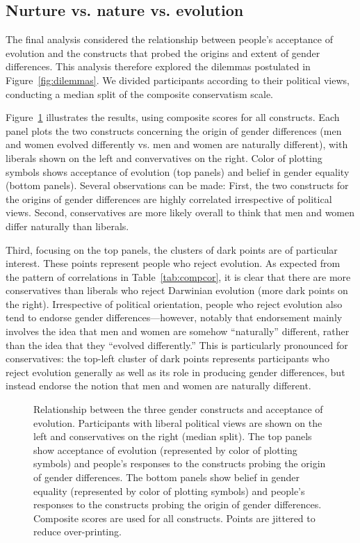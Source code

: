 \documentclass[fignum,man]{apa}\usepackage[]{graphicx}\usepackage[]{color}
\begin{document}
\subsection{Nurture vs. nature vs. evolution}
The final analysis considered the relationship between people's
acceptance of evolution and the 
constructs that probed the origins and extent of gender differences. 
This analysis therefore explored the dilemmas postulated in 
Figure~\ref{fig:dilemmas}.
We divided participants according to their political views,
conducting a median split of the composite conservatism scale.

Figure~\ref{fig:conslibevogrid} illustrates the results,
using composite scores for all constructs. 
Each panel 
plots
the two constructs concerning the origin of gender differences (men and women evolved
differently vs. men and women are naturally different), with liberals shown
on the left and convervatives on the right.
Color of plotting symbols shows acceptance of evolution (top panels) and
belief in gender equality (bottom panels).
Several observations can be made:
First, the two constructs for the origins of gender differences are highly
correlated irrespective of political views.
Second, conservatives are more likely overall to think that
men and women differ naturally than liberals. 

Third, focusing on the top panels, 
the clusters of dark points are of particular interest. These points
represent people
who reject evolution. As expected from the pattern of correlations in 
Table~\ref{tab:compcor}, it is 
clear that there are more conservatives
than liberals who reject Darwinian evolution (more dark points on the right). 
Irrespective
of political orientation, people
who reject evolution also tend to endorse gender differences---however,
notably that endorsement mainly involves the idea that men and women are
somehow ``naturally'' different, rather than the idea that they
``evolved differently.'' This is particularly pronounced for conservatives:
the top-left cluster of dark points represents participants who reject
evolution generally as well as its role in producing gender differences, but instead
endorse the notion that men and women are naturally different.

\begin{figure}[tp] %
\caption{Relationship between the three gender constructs and acceptance of evolution.
	Participants with liberal political
	views are shown on the left and conservatives on the right (median split).
	The top panels show
	acceptance of evolution (represented by color
of plotting symbols) and people's responses to the constructs probing the
origin of gender differences. 
	The bottom panels show belief in gender equality (represented by
color of plotting symbols) and people's responses to the constructs probing the
origin of gender differences. 
Composite scores are used for all constructs.
Points are jittered to reduce over-printing.}
\label{fig:conslibevogrid}
\end{figure}
\end{document}

